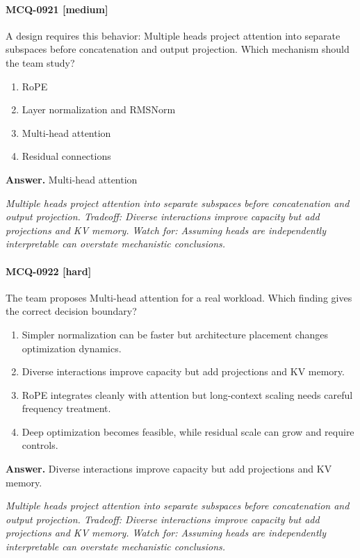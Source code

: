 \paragraph{MCQ-0921 [medium]} A design requires this behavior: Multiple heads project attention into separate subspaces before concatenation and output projection. Which mechanism should the team study?
\begin{enumerate}[label=\Alph*.]
\item RoPE
\item Layer normalization and RMSNorm
\item Multi-head attention
\item Residual connections
\end{enumerate}
\noindent\textbf{Answer.} Multi-head attention
\par\textit{Multiple heads project attention into separate subspaces before concatenation and output projection. Tradeoff: Diverse interactions improve capacity but add projections and KV memory. Watch for: Assuming heads are independently interpretable can overstate mechanistic conclusions.}
\paragraph{MCQ-0922 [hard]} The team proposes Multi-head attention for a real workload. Which finding gives the correct decision boundary?
\begin{enumerate}[label=\Alph*.]
\item Simpler normalization can be faster but architecture placement changes optimization dynamics.
\item Diverse interactions improve capacity but add projections and KV memory.
\item RoPE integrates cleanly with attention but long-context scaling needs careful frequency treatment.
\item Deep optimization becomes feasible, while residual scale can grow and require controls.
\end{enumerate}
\noindent\textbf{Answer.} Diverse interactions improve capacity but add projections and KV memory.
\par\textit{Multiple heads project attention into separate subspaces before concatenation and output projection. Tradeoff: Diverse interactions improve capacity but add projections and KV memory. Watch for: Assuming heads are independently interpretable can overstate mechanistic conclusions.}

